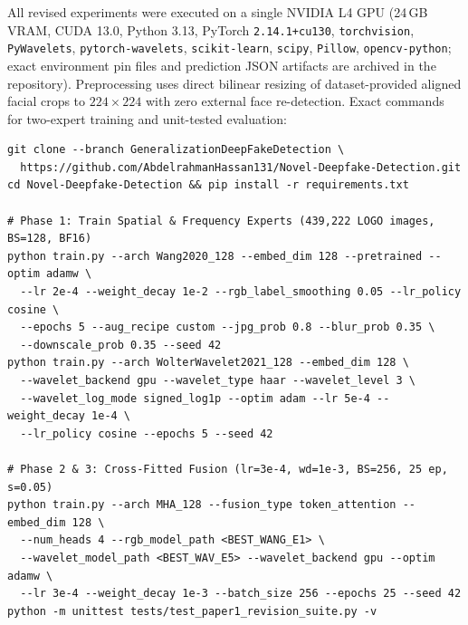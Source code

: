 \documentclass[fleqn,10pt]{wlscirep}
\begin{document}
All revised experiments were executed on a single NVIDIA L4 GPU (24\,GB VRAM, CUDA 13.0, Python 3.13, PyTorch \texttt{2.14.1+cu130}, \texttt{torchvision}, \texttt{PyWavelets}, \texttt{pytorch-wavelets}, \texttt{scikit-learn}, \texttt{scipy}, \texttt{Pillow}, \texttt{opencv-python}; exact environment pin files and prediction JSON artifacts are archived in the repository). Preprocessing uses direct bilinear resizing of dataset-provided aligned facial crops to $224 \times 224$ with zero external face re-detection. Exact commands for two-expert training and unit-tested evaluation:
{\scriptsize
\begin{verbatim}
git clone --branch GeneralizationDeepFakeDetection \
  https://github.com/AbdelrahmanHassan131/Novel-Deepfake-Detection.git
cd Novel-Deepfake-Detection && pip install -r requirements.txt

# Phase 1: Train Spatial & Frequency Experts (439,222 LOGO images, BS=128, BF16)
python train.py --arch Wang2020_128 --embed_dim 128 --pretrained --optim adamw \
  --lr 2e-4 --weight_decay 1e-2 --rgb_label_smoothing 0.05 --lr_policy cosine \
  --epochs 5 --aug_recipe custom --jpg_prob 0.8 --blur_prob 0.35 \
  --downscale_prob 0.35 --seed 42
python train.py --arch WolterWavelet2021_128 --embed_dim 128 \
  --wavelet_backend gpu --wavelet_type haar --wavelet_level 3 \
  --wavelet_log_mode signed_log1p --optim adam --lr 5e-4 --weight_decay 1e-4 \
  --lr_policy cosine --epochs 5 --seed 42

# Phase 2 & 3: Cross-Fitted Fusion (lr=3e-4, wd=1e-3, BS=256, 25 ep, s=0.05)
python train.py --arch MHA_128 --fusion_type token_attention --embed_dim 128 \
  --num_heads 4 --rgb_model_path <BEST_WANG_E1> \
  --wavelet_model_path <BEST_WAV_E5> --wavelet_backend gpu --optim adamw \
  --lr 3e-4 --weight_decay 1e-3 --batch_size 256 --epochs 25 --seed 42
python -m unittest tests/test_paper1_revision_suite.py -v
\end{verbatim}
}
\end{document}
